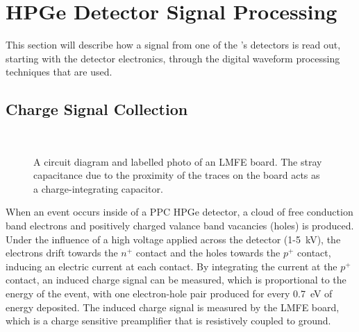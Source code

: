\documentclass[/main.tex]{subfiles}
\begin{document}
\section{HPGe Detector Signal Processing} \label{sec:mjprocessing}
This section will describe how a signal from one of the \MJD's detectors is read out, starting with the detector electronics, through the digital waveform processing techniques that are used.

\subsection{Charge Signal Collection} \label{sec:signalelectronics}
\begin{figure}
  \centering
  ~
  \caption[LMFE circuit diagram and photo]{\label{fig:lmfe}
    A circuit diagram and labelled photo of an LMFE board. The stray capacitance due to the proximity of the traces on the board acts as a charge-integrating capacitor.
  }
\end{figure}
When an event occurs inside of a PPC HPGe detector, a cloud of free conduction band electrons and positively charged valance band vacancies (holes) is produced.
Under the influence of a high voltage applied across the detector (1-5~kV), the electrons drift towards the $n^+$ contact and the holes towards the $p^+$ contact, inducing an electric current at each contact.
By integrating the current at the $p^+$ contact, an induced charge signal can be measured, which is proportional to the energy of the event, with one electron-hole pair produced for every 0.7~eV of energy deposited.
The induced charge signal is measured by the LMFE board, which is a charge sensitive preamplifier that is resistively coupled to ground\cite{barton2012}.
\end{document}
